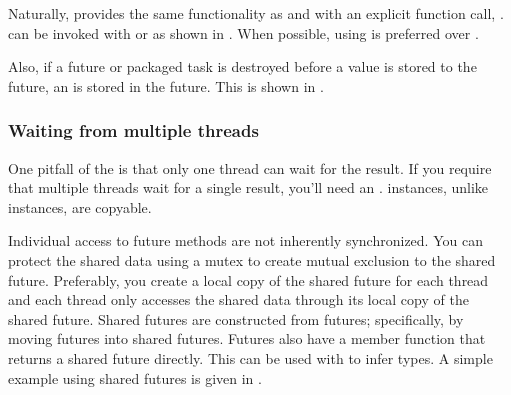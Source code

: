 
Naturally,  provides the same functionality as  and  with an explicit function call, .  can be invoked with  or  as shown in . When possible, using  is preferred over .


Also, if a future or packaged task is destroyed before a value is stored to the future, an  is stored in the future. This is shown in .


\subsubsection{Waiting from multiple threads}
One pitfall of the  is that only one thread can wait for the result. If you require that multiple threads wait for a single result, you'll need an .  instances, unlike  instances, are copyable.

Individual access to future methods are not inherently synchronized. You can protect the shared data using a mutex to create mutual exclusion to the shared future. Preferably, you create a local copy of the shared future for each thread and each thread only accesses the shared data through its local copy of the shared future. Shared futures are constructed from futures; specifically, by moving futures into shared futures. Futures also have a member function  that returns a shared future directly. This can be used with  to infer types. A simple example using shared futures is given in .


